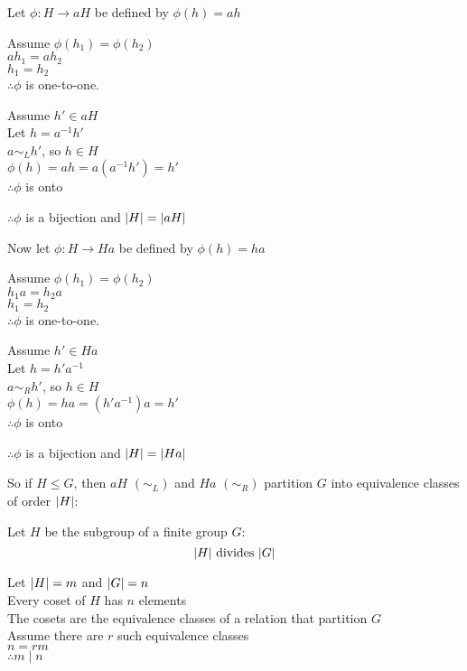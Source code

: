 \documentclass[letterpaper,12pt,fleqn]{article}
\renewcommand{\l}{\sim_L}
\renewcommand{\r}{\sim_R}
\newcommand{\p}{\phi}
\begin{document}
\begin{theproof}
  Let $\p:H\to aH$ be defined by $\p(h)=ah$

  \begin{minipage}[t]{3in}
    Assume $\p(h_1)=\p(h_2)$ \\
    $ah_1=ah_2$ \\
    $h_1=h_2$ \\
    $\therefore \p$ is one-to-one.
  \end{minipage}
  \begin{minipage}[t]{3in}
    Assume $h'\in aH$ \\
    Let $h=a^{-1}h'$ \\
    $a\l h'$, so $h\in H$ \\
    $\p(h)=ah=a(a^{-1}h')=h'$ \\
    $\therefore \p$ is onto
  \end{minipage}

  $\therefore \p$ is a bijection and $\lvert H\rvert=\lvert aH\rvert$

  \bigskip

  Now let $\p:H\to Ha$ be defined by $\p(h)=ha$

  \begin{minipage}[t]{3in}
    Assume $\p(h_1)=\p(h_2)$ \\
    $h_1a=h_2a$ \\
    $h_1=h_2$ \\
    $\therefore \p$ is one-to-one.
  \end{minipage}
  \begin{minipage}[t]{3in}
    Assume $h'\in Ha$ \\
    Let $h=h'a^{-1}$ \\
    $a\r h'$, so $h\in H$ \\
    $\p(h)=ha=(h'a^{-1})a=h'$ \\
    $\therefore \p$ is onto
  \end{minipage}

  $\therefore \p$ is a bijection and $\lvert H\rvert=\lvert Ha\rvert$
\end{theproof}

So if $H\le G$, then $aH$ $(\l)$ and $Ha$ $(\r)$ partition $G$ into equivalence
classes of order $\lvert H\rvert$:

\begin{theorem}[Lagrange]
  Let $H$ be the subgroup of a finite group $G$:
  \[\abs{H}\ \mbox{divides}\ \abs{G}\]
\end{theorem}

\begin{theproof}
  Let $\lvert H\rvert=m$ and $\lvert G\rvert=n$ \\
  Every coset of $H$ has $n$ elements \\
  The cosets are the equivalence classes of a relation that partition $G$ \\
  Assume there are $r$ such equivalence classes \\
  $n=rm$ \\
  $\therefore m\mid n$
\end{theproof}
\end{document}
